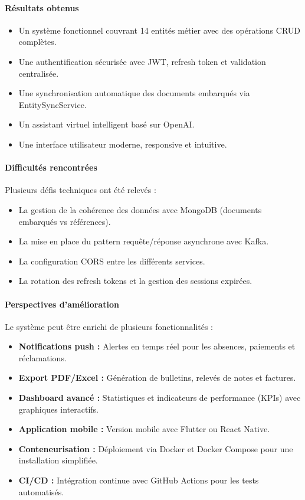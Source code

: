 \documentclass[12pt,a4paper,twoside]{report}
\begin{document}
\paragraph{Résultats obtenus}
\begin{itemize}[leftmargin=*]
  \item Un système fonctionnel couvrant 14 entités métier avec des opérations CRUD complètes.
  \item Une authentification sécurisée avec JWT, refresh token et validation centralisée.
  \item Une synchronisation automatique des documents embarqués via EntitySyncService.
  \item Un assistant virtuel intelligent basé sur OpenAI.
  \item Une interface utilisateur moderne, responsive et intuitive.
\end{itemize}

\paragraph{Difficultés rencontrées}
Plusieurs défis techniques ont été relevés :
\begin{itemize}[leftmargin=*]
  \item La gestion de la cohérence des données avec MongoDB (documents embarqués vs références).
  \item La mise en place du pattern requête/réponse asynchrone avec Kafka.
  \item La configuration CORS entre les différents services.
  \item La rotation des refresh tokens et la gestion des sessions expirées.
\end{itemize}

\paragraph{Perspectives d'amélioration}
Le système peut être enrichi de plusieurs fonctionnalités :
\begin{itemize}[leftmargin=*]
  \item \textbf{Notifications push :} Alertes en temps réel pour les absences, paiements et réclamations.
  \item \textbf{Export PDF/Excel :} Génération de bulletins, relevés de notes et factures.
  \item \textbf{Dashboard avancé :} Statistiques et indicateurs de performance (KPIs) avec graphiques interactifs.
  \item \textbf{Application mobile :} Version mobile avec Flutter ou React Native.
  \item \textbf{Conteneurisation :} Déploiement via Docker et Docker Compose pour une installation simplifiée.
  \item \textbf{CI/CD :} Intégration continue avec GitHub Actions pour les tests automatisés.
\end{itemize}
\end{document}
